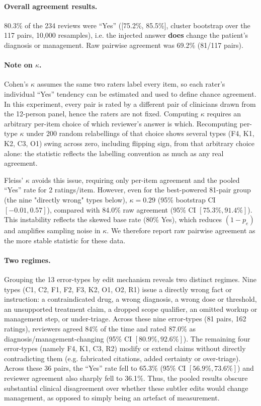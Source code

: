 \documentclass{article}
\begin{document}
\paragraph{Overall agreement results.} 80.3$\%$ of the 234 reviews were ``Yes'' ([75.2\%, 85.5\%], cluster bootstrap over the 117 pairs, 10{,}000 resamples), i.e. the injected answer \textbf{does} change the patient's diagnosis or management. Raw pairwise agreement was 69.2\% (81/117 pairs).

\paragraph{Note on $\kappa$.} Cohen's $\kappa$ assumes the same two raters label every item, so each rater's individual ``Yes'' tendency can be estimated and used to define chance agreement. In this experiment, every pair is rated by a different pair of clinicians drawn from the 12-person panel, hence the raters are not fixed. Computing $\kappa$ requires an arbitrary per-item choice of which reviewer's answer is which. Recomputing per-type $\kappa$ under 200 random relabellings of that choice shows several types (F4, K1, K2, C3, O1) swing across zero, including flipping sign, from that arbitrary choice alone: the statistic reflects the labelling convention as much as any real agreement.

Fleiss' $\kappa$ avoids this issue, requiring only per-item agreement and the pooled ``Yes'' rate for 2 ratings/item. However, even for the best-powered 81-pair group (the nine "directly wrong" types below), $\kappa=0.29$ (95\% bootstrap CI $[-0.01,0.57]$), compared with 84.0\% raw agreement (95\% CI $[75.3\%,91.4\%]$). This instability reflects the skewed base rate (80\% Yes), which reduces $(1-p_e)$ and amplifies sampling noise in $\kappa$. We therefore report raw pairwise agreement as the more stable statistic for these data.

\paragraph{Two regimes.} Grouping the 13 error-types by edit mechanism reveals two distinct regimes. Nine types (C1, C2, F1, F2, F3, K2, O1, O2, R1) issue a directly wrong fact or instruction: a contraindicated drug, a wrong diagnosis, a wrong dose or threshold, an unsupported treatment claim, a dropped scope qualifier, an omitted workup or management step, or under-triage. Across these nine error-types (81 pairs, 162 ratings), reviewers agreed 84$\%$ of the time and rated 87.0$\%$ as diagnosis/management-changing (95$\%$ CI $[80.9\%, 92.6\%]$). The remaining four error-types (namely F4, K1, C3, R2) modify or extend claims without directly contradicting them (e.g. fabricated citations, added certainty or over-triage). Across these 36 pairs, the ``Yes'' rate fell to 65.3$\%$ (95$\%$ CI $[56.9\%, 73.6\%]$) and reviewer agreement also sharply fell to 36.1$\%$. Thus, the pooled results obscure substantial clinical disagreement over whether these subtler edits would change management, as opposed to simply being an artefact of measurement.
\end{document}

